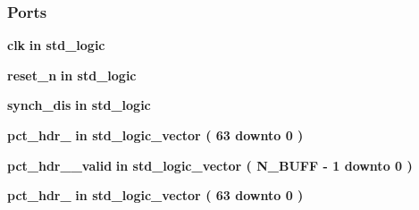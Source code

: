 \subsubsection*{Ports}
 \begin{DoxyCompactItemize}
\item 
{\bf clk}  {\bfseries {\bfseries \textcolor{keywordflow}{in}\textcolor{vhdlchar}{ }}} {\bfseries \textcolor{comment}{std\+\_\+logic}\textcolor{vhdlchar}{ }} 
\item 
{\bf reset\+\_\+n}  {\bfseries {\bfseries \textcolor{keywordflow}{in}\textcolor{vhdlchar}{ }}} {\bfseries \textcolor{comment}{std\+\_\+logic}\textcolor{vhdlchar}{ }} 
\item 
{\bf synch\+\_\+dis}  {\bfseries {\bfseries \textcolor{keywordflow}{in}\textcolor{vhdlchar}{ }}} {\bfseries \textcolor{comment}{std\+\_\+logic}\textcolor{vhdlchar}{ }} 
\item 
{\bf pct\+\_\+hdr\+\_}  {\bfseries {\bfseries \textcolor{keywordflow}{in}\textcolor{vhdlchar}{ }}} {\bfseries \textcolor{comment}{std\+\_\+logic\+\_\+vector}\textcolor{vhdlchar}{ }\textcolor{vhdlchar}{(}\textcolor{vhdlchar}{ }\textcolor{vhdlchar}{ } \textcolor{vhdldigit}{63} \textcolor{vhdlchar}{ }\textcolor{keywordflow}{downto}\textcolor{vhdlchar}{ }\textcolor{vhdlchar}{ } \textcolor{vhdldigit}{0} \textcolor{vhdlchar}{ }\textcolor{vhdlchar}{)}\textcolor{vhdlchar}{ }} 
\item 
{\bf pct\+\_\+hdr\+\_\+\_\+valid}  {\bfseries {\bfseries \textcolor{keywordflow}{in}\textcolor{vhdlchar}{ }}} {\bfseries \textcolor{comment}{std\+\_\+logic\+\_\+vector}\textcolor{vhdlchar}{ }\textcolor{vhdlchar}{(}\textcolor{vhdlchar}{ }\textcolor{vhdlchar}{ }\textcolor{vhdlchar}{ }\textcolor{vhdlchar}{ }{\bfseries {\bf N\+\_\+\+B\+U\+FF}} \textcolor{vhdlchar}{-\/}\textcolor{vhdlchar}{ } \textcolor{vhdldigit}{1} \textcolor{vhdlchar}{ }\textcolor{keywordflow}{downto}\textcolor{vhdlchar}{ }\textcolor{vhdlchar}{ } \textcolor{vhdldigit}{0} \textcolor{vhdlchar}{ }\textcolor{vhdlchar}{)}\textcolor{vhdlchar}{ }} 
\item 
{\bf pct\+\_\+hdr\+\_}  {\bfseries {\bfseries \textcolor{keywordflow}{in}\textcolor{vhdlchar}{ }}} {\bfseries \textcolor{comment}{std\+\_\+logic\+\_\+vector}\textcolor{vhdlchar}{ }\textcolor{vhdlchar}{(}\textcolor{vhdlchar}{ }\textcolor{vhdlchar}{ } \textcolor{vhdldigit}{63} \textcolor{vhdlchar}{ }\textcolor{keywordflow}{downto}\textcolor{vhdlchar}{ }\textcolor{vhdlchar}{ } \textcolor{vhdldigit}{0} \textcolor{vhdlchar}{ }\textcolor{vhdlchar}{)}\textcolor{vhdlchar}{ }} 
\item 

\end{DoxyCompactItemize}
